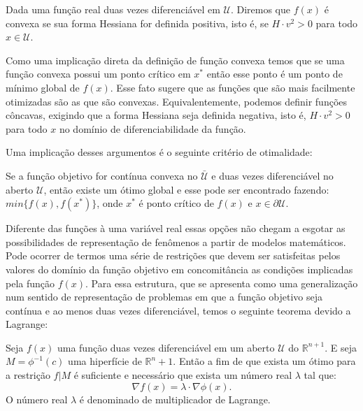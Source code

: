 \begin{definition}
  Dada uma função real duas vezes diferenciável em $\mathcal{U}$. Diremos que $f(x)$ é convexa se sua forma Hessiana for definida positiva, isto é, se $H \cdot v^2> 0$ para todo $x \in\mathcal{U}$.
\end{definition}

\par Como uma implicação direta da definição de função convexa temos que se uma função convexa possui um ponto crítico em $x^{*}$ então esse ponto é um ponto de mínimo global de $f(x)$. Esse fato sugere que as funções que são mais facilmente otimizadas são as que são convexas. Equivalentemente, podemos definir funções côncavas, exigindo que a forma Hessiana seja definida negativa, isto é, $H \cdot v^2> 0$ para todo $x$ no domínio de diferenciabilidade da função.
\par Uma implicação desses argumentos é o seguinte critério de otimalidade:

\begin{theorem}
  Se a função objetivo for contínua convexa no $\mathcal{\bar{U}}$ e duas vezes diferenciável no aberto $\mathcal{U}$, então existe um ótimo global e esse pode ser encontrado fazendo: $min\{f(x), f(x^{*})\}$, onde $x^{*}$ é ponto crítico de $f(x)$ e $x \in \partial \mathcal{U}$. 
\end{theorem}

\par Diferente das funções à uma variável real essas opções não chegam a esgotar as possibilidades de representação de fenômenos a partir de modelos matemáticos. Pode ocorrer de termos uma série de restrições que devem ser satisfeitas pelos valores do domínio da função objetivo em concomitância as condições implicadas pela função $f(x)$. Para essa estrutura, que se apresenta como uma generalização num sentido de representação de problemas em que a função objetivo seja contínua e ao menos duas vezes diferenciável, temos o seguinte teorema devido a Lagrange:

\begin{theorem}
  Seja $f(x)$ uma função duas vezes diferenciável em um aberto $\mathcal{U}$ do $\mathbb{R}^{n+1}$. E seja $M = \phi^{-1}(c)$ uma hiperfície de $\mathbb{R}^n+1$. Então a fim de que exista um ótimo para a restrição $f|M$ é suficiente e necessário que exista um número real $\lambda$ tal que:
  $$\nabla f(x) = \lambda \cdot \nabla \phi(x).$$
  O número real $\lambda$ é denominado de multiplicador de Lagrange.
\end{theorem}

